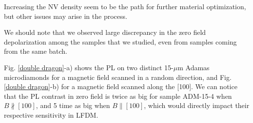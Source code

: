 \documentclass[a4paper, 11pt]{book}
\begin{document}
Increasing the NV density seem to be the path for further material optimization, but other issues may arise in the process.

We should note that we observed large discrepancy in the zero field depolarization among the samples that we studied, even from samples coming from the same batch.

%
%
%



Fig. \ref{double dragon}-a) shows the PL on two distinct 15-$\mu$m Adamas microdiamonds for a magnetic field scanned in a random direction, and Fig. \ref{double dragon}-b) for a magnetic field scanned along the [100]. We can notice that the PL contrast in zero field is twice as big for sample ADM-15-4 when $B \nparallel [100]$, and 5 time as big when $B \parallel [100]$, which would directly impact their respective sensitivity in LFDM.
\end{document}
